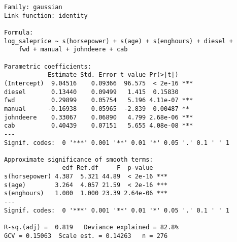 \begin{verbatim}
Family: gaussian 
Link function: identity 

Formula:
log_saleprice ~ s(horsepower) + s(age) + s(enghours) + diesel + 
    fwd + manual + johndeere + cab

Parametric coefficients:
            Estimate Std. Error t value Pr(>|t|)    
(Intercept)  9.04516    0.09366  96.575  < 2e-16 ***
diesel       0.13440    0.09499   1.415  0.15830    
fwd          0.29899    0.05754   5.196 4.11e-07 ***
manual      -0.16938    0.05965  -2.839  0.00487 ** 
johndeere    0.33067    0.06890   4.799 2.68e-06 ***
cab          0.40439    0.07151   5.655 4.08e-08 ***
---
Signif. codes:  0 '***' 0.001 '**' 0.01 '*' 0.05 '.' 0.1 ' ' 1

Approximate significance of smooth terms:
                edf Ref.df     F  p-value    
s(horsepower) 4.387  5.321 44.89  < 2e-16 ***
s(age)        3.264  4.057 21.59  < 2e-16 ***
s(enghours)   1.000  1.000 23.39 2.64e-06 ***
---
Signif. codes:  0 '***' 0.001 '**' 0.01 '*' 0.05 '.' 0.1 ' ' 1

R-sq.(adj) =  0.819   Deviance explained = 82.8%
GCV = 0.15063  Scale est. = 0.14263   n = 276
\end{verbatim}